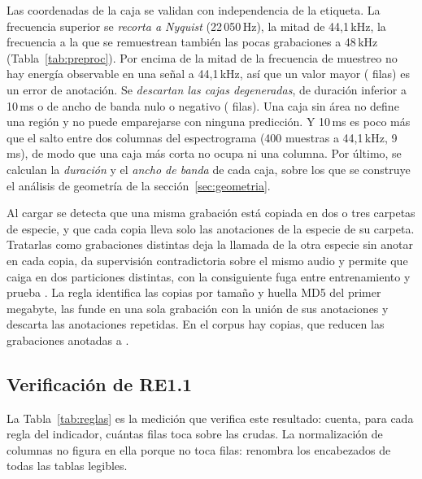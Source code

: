 \label{sec:saneamiento}
Las coordenadas de la caja se validan con
independencia de la etiqueta. La frecuencia superior se \emph{recorta a Nyquist}
(22\,050\,Hz), la mitad de 44,1\,kHz, la frecuencia a la que se remuestrean
también las pocas grabaciones a 48\,kHz (Tabla~\ref{tab:preproc}). Por encima de la mitad de la
frecuencia de muestreo no hay energía observable en una señal a 44,1\,kHz, así que un valor mayor (\nNyquist{} filas) es
un error de anotación. Se \emph{descartan las cajas degeneradas}, de duración
inferior a 10\,ms o de ancho de banda nulo o negativo (\nDegenerate{} filas). Una
caja sin área no define una región y no puede emparejarse con ninguna predicción.
Y 10\,ms es poco más que el salto entre dos columnas del espectrograma (400
muestras a 44,1\,kHz, 9\,ms), de modo que una caja más corta no ocupa ni una
columna. Por último, se
calculan la \emph{duración} y el \emph{ancho de banda} de cada caja, sobre los que
se construye el análisis de geometría de la sección~\ref{sec:geometria}.

\label{sec:copias}
Al cargar  se detecta que una misma grabación está copiada en dos
o tres carpetas de especie, y que cada copia lleva solo las
anotaciones de la especie de su carpeta. Tratarlas como grabaciones distintas
deja la llamada de la otra especie sin anotar en cada copia, da supervisión
contradictoria sobre el mismo audio y permite que caiga en dos particiones
distintas, con la consiguiente fuga entre entrenamiento y prueba
\citep{barz_duplicates_2020}. La regla
identifica las copias por tamaño y huella MD5 del primer megabyte, las funde en
una sola grabación con la unión de sus anotaciones y descarta las anotaciones
repetidas. En el corpus hay \nCopies{} copias, que reducen las grabaciones
anotadas a \nUniqueRecordings{}.

\subsection{Verificación de RE1.1}
\label{sec:verificacion-re11}

La Tabla~\ref{tab:reglas} es la medición que verifica este resultado: cuenta, para
cada regla del indicador, cuántas filas toca sobre las \nRawRows{} crudas. La
normalización de columnas no figura en ella porque no toca filas: renombra los
encabezados de todas las tablas legibles.

